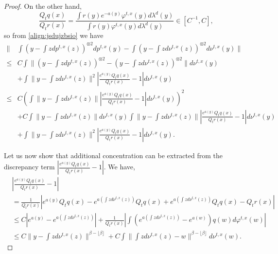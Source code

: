 \documentclass{article}
\begin{document}
\begin{proof}
On the other hand,
$$\frac{Q_tq(x)}{Q_tr(x)} = \frac{\int r(y)e^{-a(y)}\varphi^{t,x}(y)d\lambda^d(y)}{\int r(y)\varphi^{t,x}(y)d\lambda^d(y)} \in [C^{-1},C],$$
so from \eqref{align:jsdujzbsio} we have
\begin{align}\label{align:brzdijnzide}
    \|&\int \left(y-\int zdp^{t,x}(z)\right)^{\otimes 2}dp^{t,x}(y)-\int\left(y-\int zd\nu^{t,x}(z)\right)^{\otimes 2}d\nu^{t,x}(y)\|\nonumber\\
     \leq &C\int \|\left(y-\int zdp^{t,x}(z)\right)^{\otimes 2}-\left(y-\int zd\nu^{t,x}(z)\right)^{\otimes 2}\|d\nu^{t,x}(y)\nonumber\\
    &+\int \|y-\int zd\nu^{t,x}(z)\|^{ 2}|\frac{e^{a(y)}Q_tq(x)}{Q_tr(x)}-1|d\nu^{t,x}(y)\nonumber\\
     \leq &C\left(\int \|y-\int zd\nu^{t,x}(z)\||\frac{e^{a(y)}Q_tq(x)}{Q_tr(x)}-1|d\nu^{t,x}(y)\right)^2\nonumber\\
    & + C\int \|y-\int zd\nu^{t,x}(z)\|d\nu^{t,x}(y)\int \|y-\int zd\nu^{t,x}(z)\||\frac{e^{a(y)}Q_tq(x)}{Q_tr(x)}-1|d\nu^{t,x}(y)\nonumber\\
    &+\int \|y-\int zd\nu^{t,x}(z)\|^{ 2}|\frac{e^{a(y)}Q_tq(x)}{Q_tr(x)}-1|d\nu^{t,x}(y).
\end{align}

Let us now show that additional concentration can be extracted from the discrepancy term \( \left| \frac{e^{a(y)} Q_t q(x)}{Q_t r(x)} - 1 \right| \). We have,
\begin{align*}
&|\frac{e^{a(y)}Q_tq(x)}{Q_tr(x)}-1|\\
&=\frac{1}{Q_tr(x)}|e^{a(y)}Q_tq(x)-e^{a\left(\int zd\nu^{t,x}(z)\right)}Q_tq(x)+e^{a\left(\int zd\nu^{t,x}(z)\right)}Q_tq(x)-Q_tr(x)|\\
&\leq C |e^{a(y)}-e^{a\left(\int zd\nu^{t,x}(z)\right)}|+\frac{1}{Q_tr(x)}|\int\left( e^{a\left(\int zd\nu^{t,x}(z)\right)}-e^{a(w)}\right)q(w)d\varphi^{t,x}(w)|\\
&\leq C \|y-\int zd\nu^{t,x}(z)\|^{\beta-\lfloor \beta\rfloor}+C\int\|\int zd\nu^{t,x}(z)-w\|^{\beta-\lfloor \beta\rfloor}d\nu^{t,x}(w).
\end{align*}






\end{proof}
\end{document}
